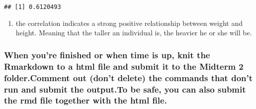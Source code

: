 \documentclass[
]{article}
\providecommand{\tightlist}{%
  \setlength{\itemsep}{0pt}\setlength{\parskip}{0pt}}
\begin{document}
\begin{verbatim}
## [1] 0.6120493
\end{verbatim}

\begin{enumerate}
\def\labelenumi{\alph{enumi})}
\setcounter{enumi}{2}
\tightlist
\item
  the correlation indicates a strong positive relationship between
  weight and height. Meaning that the taller an individual is, the
  heavier he or she will be.
\end{enumerate}

\hypertarget{when-youre-finished-or-when-time-is-up-knit-the-rmarkdown-to-a-html-file-and-submit-it-to-the-midterm-2-folder.comment-out-dont-delete-the-commands-that-dont-run-and-submit-the-output.to-be-safe-you-can-also-submit-the-rmd-file-together-with-the-html-file.}{%
\subsubsection{When you're finished or when time is up, knit the
Rmarkdown to a html file and submit it to the Midterm 2 folder.Comment
out (don't delete) the commands that don't run and submit the output.To
be safe, you can also submit the rmd file together with the html
file.}\label{when-youre-finished-or-when-time-is-up-knit-the-rmarkdown-to-a-html-file-and-submit-it-to-the-midterm-2-folder.comment-out-dont-delete-the-commands-that-dont-run-and-submit-the-output.to-be-safe-you-can-also-submit-the-rmd-file-together-with-the-html-file.}}
\end{document}
